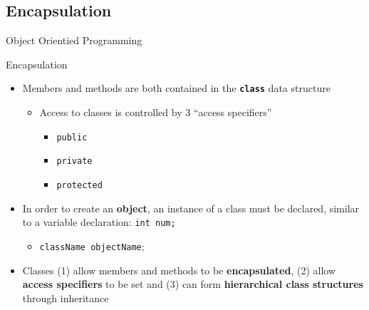 \documentclass[compress]{beamer}
\begin{document}
 \subsection{Encapsulation}
 
 \begin{frame}{Object Orientied Programming}
      \begin{block}{Encapsulation}
\begin{itemize}
 	\item Members and methods are both contained in the \textbf{\texttt{class}} data structure
 	\begin{itemize}
 		\item Access to classes is controlled by 3 ``access specifiers''
 		\begin{itemize}
 			\item \texttt{public}
 			\item \texttt{private}
 			\item \texttt{protected}
 		\end{itemize}
 	\end{itemize}
 	\item In order to create an \textbf{object}, an instance of a class must be declared, similar to a variable declaration: \texttt{int num;}

 		\begin{itemize}
 		\item \texttt{className objectName};
 		\end{itemize}
 	\item Classes (1) allow members and methods to be \textbf{encapsulated}, (2) allow \textbf{access specifiers} to be set and (3) can form \textbf{hierarchical class structures} through inheritance
\end{itemize}
      \end{block}
 \end{frame}
\end{document}
